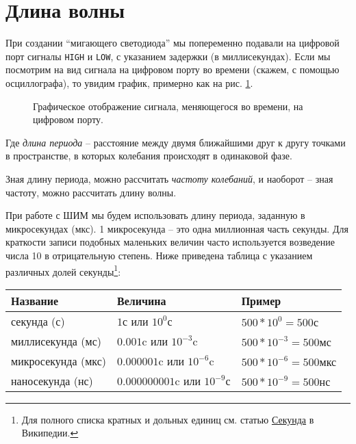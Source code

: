 \documentclass[../sparc.tex]{subfiles}
\begin{document}
\section{Длина волны}

При создании ``мигающего светодиода'' мы попеременно подавали на цифровой порт
сигналы \texttt{HIGH} и \texttt{LOW}, с указанием задержки (в миллисекундах).
Если мы посмотрим на вид сигнала на цифровом порту во времени (скажем, с помощью
осциллографа), то увидим график, примерно как на рис.
\ref{fig:blinking-led-graph}.

\begin{figure}[ht]
  \caption{Графическое отображение сигнала, меняющегося во времени, на цифровом
    порту.}
  \label{fig:blinking-led-graph}
\end{figure}

Где \emph{длина периода} -- расстояние между двумя ближайшими друг к другу
точками в пространстве, в которых колебания происходят в одинаковой фазе.

Зная длину периода, можно рассчитать \emph{частоту колебаний}, и наоборот --
зная частоту, можно рассчитать длину волны.

При работе с ШИМ мы будем использовать длину периода, заданную в микросекундах
(мкс). 1 микросекунда -- это одна миллионная часть секунды. Для краткости записи
подобных маленьких величин часто используется возведение числа 10 в
отрицательную степень. Ниже приведена таблица с указанием различных долей
секунды\footnote{Для полного списка кратных и дольных единиц см. статью
\href{https://ru.wikipedia.org/wiki/\%D0\%A1\%D0\%B5\%D0\%BA\%D1\%83\%D0\%BD\%D0\%B4\%D0\%B0}{Секунда}
в Википедии.}:

\begin{tabular}{p{3cm}|p{4cm}|p{3cm}}
  Название & Величина & Пример \\
  \hline \hline
  секунда (с) & $ 1 \mbox{с} $ или $ 10^0 \mbox{с} $ & $ 500 * 10^{0} = 500 \mbox{с} $ \\
  \hline
  миллисекунда (мс) & $ 0.001 \mbox{c} $ или $ 10^{-3} \mbox{c} $ & $ 500 * 10^{-3} = 500 \mbox{мс} $ \\
  \hline
  микросекунда (мкс) & $ 0.000001 \mbox{c} $ или $ 10^{-6} \mbox{c} $ & $ 500 * 10^{-6} = 500 \mbox{мкс} $ \\
  \hline
  наносекунда (нс) & $ 0.000000001 \mbox{c} $ или $ 10^{-9} \mbox{с} $ & $ 500 * 10^{-9} = 500 \mbox{нс} $
\end{tabular}
\end{document}
